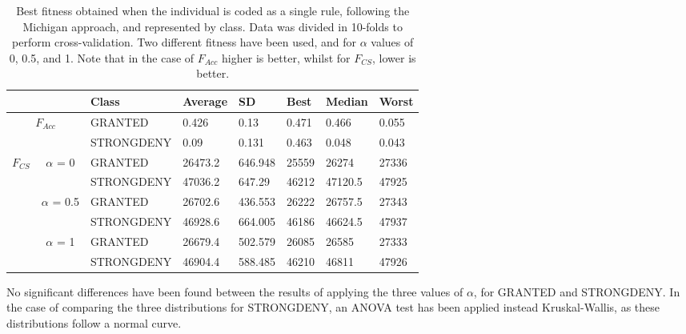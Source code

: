 \documentclass[a4paper,10pt,twocolumn,preprint,3p]{elsarticle}
\begin{document}
\begin{table*}
\begin{center}
\begin{tabular}{cc|l|l|l|l|l|l|}
\cline{3-8}
                                                &                                 & Class      & Average & SD & Best & Median & Worst \\ \hline
\multicolumn{2}{|c|}{\multirow{2}{*}{$F_{Acc}$}}                                  & GRANTED    & 0.426 & 0.13 & 0.471 & 0.466 & 0.055 \\ \cline{3-8} 
\multicolumn{2}{|c|}{}                                                            & STRONGDENY & 0.09 & 0.131 & 0.463 & 0.048 & 0.043 \\ \hline
\multicolumn{1}{|c|}{\multirow{6}{*}{$F_{CS}$}} & \multirow{2}{*}{$\alpha$ = 0}   & GRANTED    & 26473.2 & 646.948 & 25559 & 26274 & 27336 \\ \cline{3-8} 
\multicolumn{1}{|c|}{}                          &                                 & STRONGDENY & 47036.2 & 647.29 & 46212 & 47120.5 & 47925 \\ \cline{2-8} 
\multicolumn{1}{|c|}{}                          & \multirow{2}{*}{$\alpha$ = 0.5} & GRANTED    & 26702.6 & 436.553 & 26222 & 26757.5 & 27343 \\ \cline{3-8} 
\multicolumn{1}{|c|}{}                          &                                 & STRONGDENY & 46928.6 & 664.005 & 46186 & 46624.5 & 47937 \\ \cline{2-8} 
\multicolumn{1}{|c|}{}                          & \multirow{2}{*}{$\alpha$ = 1}   & GRANTED    & 26679.4 & 502.579 & 26085 & 26585 & 27333 \\ \cline{3-8} 
\multicolumn{1}{|c|}{}                          &                                 & STRONGDENY & 46904.4 & 588.485 & 46210 & 46811 & 47926 \\ \hline
\end{tabular}
\caption{Best fitness obtained when the individual is coded as a
  single rule, following the Michigan approach, and represented by
  class. Data was divided in 10-folds to perform cross-validation. Two
  different fitness have been used, and for $\alpha$ values of 0, 0.5,
  and 1. Note that in the case of $F_{Acc}$ higher is better, whilst
  for $F_{CS}$, lower is better.}
\label{tab:michigan}
\end{center}
\end{table*}

No significant differences have been found between the results of
applying the %
three values of $\alpha$, for GRANTED and STRONGDENY. %
In the case of comparing the three distributions %
for STRONGDENY, an ANOVA test has been applied instead Kruskal-Wallis,
as these distributions follow a normal curve. %
                                
\end{document}
